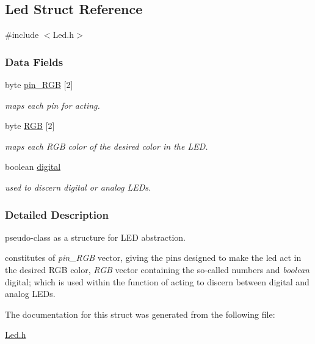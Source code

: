 \hypertarget{struct_led}{\subsection{Led Struct Reference}
\label{struct_led}
}


{\ttfamily \#include $<$Led.\+h$>$}

\subsubsection*{Data Fields}
\begin{DoxyCompactItemize}
\item 
\hypertarget{struct_led_a3c2f5acb54f43d68bc58bffa1e8a4fff}{byte \hyperlink{struct_led_a3c2f5acb54f43d68bc58bffa1e8a4fff}{pin\+\_\+\+R\+G\+B} \mbox{[}2\mbox{]}}\label{struct_led_a3c2f5acb54f43d68bc58bffa1e8a4fff}

\begin{DoxyCompactList}\small\item\em maps each pin for acting. \end{DoxyCompactList}\item 
\hypertarget{struct_led_a1ddfb78be65160acab0d1eda13c14e6d}{byte \hyperlink{struct_led_a1ddfb78be65160acab0d1eda13c14e6d}{R\+G\+B} \mbox{[}2\mbox{]}}\label{struct_led_a1ddfb78be65160acab0d1eda13c14e6d}

\begin{DoxyCompactList}\small\item\em maps each R\+G\+B color of the desired color in the L\+E\+D. \end{DoxyCompactList}\item 
\hypertarget{struct_led_a0c7d3d7031c1c42aef4475676776998c}{boolean \hyperlink{struct_led_a0c7d3d7031c1c42aef4475676776998c}{digital}}\label{struct_led_a0c7d3d7031c1c42aef4475676776998c}

\begin{DoxyCompactList}\small\item\em used to discern digital or analog L\+E\+Ds. \end{DoxyCompactList}\end{DoxyCompactItemize}


\subsubsection{Detailed Description}
pseudo-\/class as a structure for L\+E\+D abstraction.

constitutes of {\itshape pin\+\_\+\+R\+G\+B} vector, giving the pins designed to make the led act in the desired R\+G\+B color, {\itshape R\+G\+B} vector containing the so-\/called numbers and {\itshape boolean} digital; which is used within the function of acting to discern between digital and analog L\+E\+Ds. 

The documentation for this struct was generated from the following file\+:\begin{DoxyCompactItemize}
\item 
\hyperlink{_led_8h}{Led.\+h}\end{DoxyCompactItemize}
